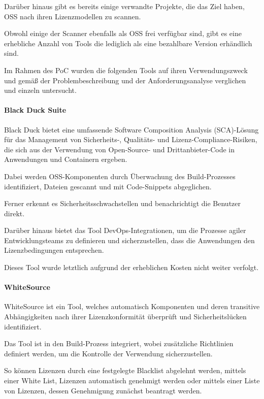 Darüber hinaus gibt es bereits einige verwandte Projekte, die das Ziel haben, OSS nach ihren Lizenzmodellen zu scannen. 

Obwohl einige der Scanner ebenfalls als OSS frei verfügbar sind, gibt es eine erhebliche Anzahl von Tools die lediglich als eine bezahlbare Version erhändlich sind.  

Im Rahmen des PoC wurden die folgenden Tools auf ihren Verwendungszweck und gemäß der Problembeschreibung und der Anforderungsanalyse verglichen und einzeln untersucht.

\paragraph{Black Duck Suite}

Black Duck bietet eine umfassende Software Composition Analysis (SCA)-Lösung für das Management von Sicherheits-, Qualitäts- und Lizenz-Compliance-Risiken, die sich aus der Verwendung von Open-Source- und Drittanbieter-Code in Anwendungen und Containern ergeben. \cite{synopsys_black_2021}

Dabei werden OSS-Komponenten durch Überwachung des Build-Prozesses identifiziert, Dateien gescannt und mit Code-Snippets abgeglichen. 

Ferner erkennt es Sicherheitsschwachstellen und benachrichtigt die Benutzer direkt. 

Darüber hinaus bietet das Tool DevOps-Integrationen, um die Prozesse agiler Entwicklungsteams zu definieren und sicherzustellen, dass die Anwendungen den Lizenzbedingungen entsprechen.

Dieses Tool wurde letztlich aufgrund der erheblichen Kosten nicht weiter verfolgt.

\paragraph{WhiteSource}

WhiteSource ist ein Tool, welches automatisch Komponenten und deren transitive Abhängigkeiten nach ihrer Lizenzkonformität überprüft und Sicherheitslücken identifiziert. \cite{whitesource_software_whitesource_2021}  

Das Tool ist in den Build-Prozess integriert, wobei zusätzliche Richtlinien definiert werden, um die Kontrolle der Verwendung sicherzustellen. 

So können Lizenzen durch eine festgelegte Blacklist abgelehnt werden, mittels einer White List, Lizenzen automatisch genehmigt werden oder mittels einer Liste von Lizenzen, dessen Genehmigung zunächst beantragt werden. 

